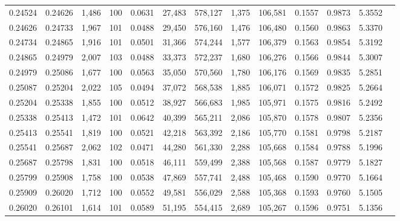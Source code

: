 \begin{tabular}{rrrrrrrrrrrrr}
0.24524 & 0.24626 & 1,486 & 100 &                                     0.0631 &  27,483 & 578,127 &   1,375 & 106,581 & 0.1557 & 0.9873 & 5.3552 \\
0.24626 & 0.24733 & 1,967 & 101 &                                     0.0488 &  29,450 & 576,160 &   1,476 & 106,480 & 0.1560 & 0.9863 & 5.3370 \\
0.24734 & 0.24865 & 1,916 & 101 &                                     0.0501 &  31,366 & 574,244 &   1,577 & 106,379 & 0.1563 & 0.9854 & 5.3192 \\
0.24865 & 0.24979 & 2,007 & 103 &                                     0.0488 &  33,373 & 572,237 &   1,680 & 106,276 & 0.1566 & 0.9844 & 5.3007 \\
0.24979 & 0.25086 & 1,677 & 100 &                                     0.0563 &  35,050 & 570,560 &   1,780 & 106,176 & 0.1569 & 0.9835 & 5.2851 \\
0.25087 & 0.25204 & 2,022 & 105 &                                     0.0494 &  37,072 & 568,538 &   1,885 & 106,071 & 0.1572 & 0.9825 & 5.2664 \\
0.25204 & 0.25338 & 1,855 & 100 &                                     0.0512 &  38,927 & 566,683 &   1,985 & 105,971 & 0.1575 & 0.9816 & 5.2492 \\
0.25338 & 0.25413 & 1,472 & 101 &                                     0.0642 &  40,399 & 565,211 &   2,086 & 105,870 & 0.1578 & 0.9807 & 5.2356 \\
0.25413 & 0.25541 & 1,819 & 100 &                                     0.0521 &  42,218 & 563,392 &   2,186 & 105,770 & 0.1581 & 0.9798 & 5.2187 \\
0.25541 & 0.25687 & 2,062 & 102 &                                     0.0471 &  44,280 & 561,330 &   2,288 & 105,668 & 0.1584 & 0.9788 & 5.1996 \\
0.25687 & 0.25798 & 1,831 & 100 &                                     0.0518 &  46,111 & 559,499 &   2,388 & 105,568 & 0.1587 & 0.9779 & 5.1827 \\
0.25799 & 0.25908 & 1,758 & 100 &                                     0.0538 &  47,869 & 557,741 &   2,488 & 105,468 & 0.1590 & 0.9770 & 5.1664 \\
0.25909 & 0.26020 & 1,712 & 100 &                                     0.0552 &  49,581 & 556,029 &   2,588 & 105,368 & 0.1593 & 0.9760 & 5.1505 \\
0.26020 & 0.26101 & 1,614 & 101 &                                     0.0589 &  51,195 & 554,415 &   2,689 & 105,267 & 0.1596 & 0.9751 & 5.1356 \\

\end{tabular}
